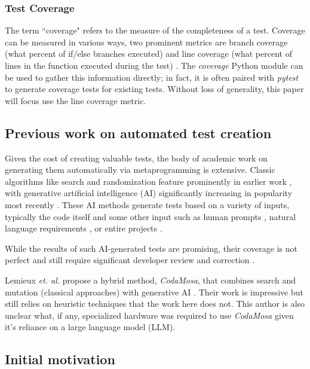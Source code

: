 \documentclass[10pt, conference]{IEEEtran}
\begin{document}
\subsubsection{Test Coverage}\label{sec:intro-cov}
The term “coverage" refers to the measure of the completeness of a test.  
Coverage can be measured in various ways, two prominent metrics are branch coverage 
(what percent of if/else branches executed) and line coverage 
(what percent of lines in the function executed during the test) 
\cite{wang2024software}. The \textit{coverage} Python module can
be used to gather this information directly; in fact, it is often paired with 
\textit{pytest} to generate coverage tests for existing tests. Without loss of 
generality, this paper will focus use the line coverage metric.

\subsection{Previous work on automated test creation}\label{sec:intro-3}

Given the cost of creating valuable tests,
the body of academic work on generating them automatically 
via metaprogramming is extensive. Classic algorithms like search 
and randomization feature prominently in earlier work 
\cite{Luk22Pynguin0170}, with generative artificial intelligence (AI)
significantly increasing in popularity most recently
\cite{bhatia2023unit,takerngsaksiri2024tdd,wang2024software, kahur2023java}.
These AI methods generate tests based on a variety of inputs, typically the code
itself and some other input such as human prompts 
\cite{lahiri2023interactivecodegenerationtestdriven},
natural language requirements \cite{wang2024software}, or entire projects
\cite{rao2023cat}.  

While the results of such AI-generated tests are promising,
their coverage is not perfect \cite{kahur2023java} and still require significant
developer review and correction \cite{sundqvist2024ai}.  

Lemieux \textit{et. al.} propose a hybrid method, \textit{CodaMosa}, that 
combines search and mutation (classical approaches) with generative AI
\cite{lemieux2023codamosa}.  Their work is impressive but still relies on 
heuristic techniques that the work here does not. This author is also unclear 
what, if any, specialized hardware was required to use \textit{CodaMosa} given
it's reliance on a large language model (LLM).

\subsection{Initial motivation}\label{sec:intro-4}
\end{document}

